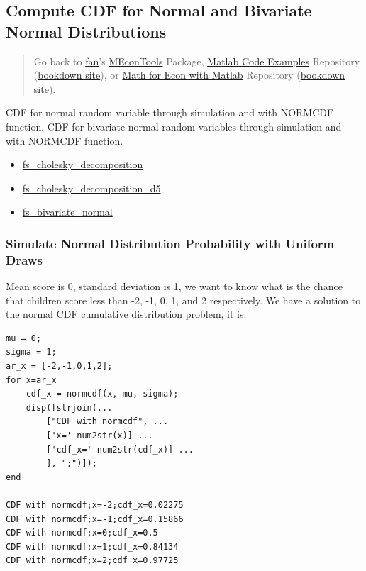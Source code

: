 \documentclass[
]{book}
\begin{document}
\hypertarget{compute-cdf-for-normal-and-bivariate-normal-distributions}{%
\subsection{Compute CDF for Normal and Bivariate Normal Distributions}\label{compute-cdf-for-normal-and-bivariate-normal-distributions}}

\begin{quote}
Go back to \href{http://fanwangecon.github.io/}{fan}'s \href{https://fanwangecon.github.io/MEconTools/}{MEconTools} Package, \href{https://fanwangecon.github.io/M4Econ/}{Matlab Code Examples} Repository (\href{https://fanwangecon.github.io/M4Econ/bookdown}{bookdown site}), or \href{https://fanwangecon.github.io/Math4Econ/}{Math for Econ with Matlab} Repository (\href{https://fanwangecon.github.io/Math4Econ/bookdown}{bookdown site}).
\end{quote}

CDF for normal random variable through simulation and with NORMCDF
function. CDF for bivariate normal random variables through simulation
and with NORMCDF function.

\begin{itemize}
\item
  \href{https://fanwangecon.github.io/M4Econ/simulation/normal/htmlpdfm/fs_cholesky_decomposition.html}{fs\_cholesky\_decomposition}
\item
  \href{https://fanwangecon.github.io/M4Econ/simulation/normal/htmlpdfm/fs_cholesky_decomposition_d5.html}{fs\_cholesky\_decomposition\_d5}
\item
  \href{https://fanwangecon.github.io/M4Econ/simulation/normal/htmlpdfm/fs_bivariate_normal.html}{fs\_bivariate\_normal}
\end{itemize}

\hypertarget{simulate-normal-distribution-probability-with-uniform-draws}{%
\subsubsection{Simulate Normal Distribution Probability with Uniform Draws}\label{simulate-normal-distribution-probability-with-uniform-draws}}

Mean score is 0, standard deviation is 1, we want to know what is the
chance that children score less than -2, -1, 0, 1, and 2 respectively.
We have a solution to the normal CDF cumulative distribution problem, it
is:

\begin{verbatim}
mu = 0;
sigma = 1;
ar_x = [-2,-1,0,1,2];
for x=ar_x
    cdf_x = normcdf(x, mu, sigma);
    disp([strjoin(...
        ["CDF with normcdf", ...
        ['x=' num2str(x)] ...
        ['cdf_x=' num2str(cdf_x)] ...
        ], ";")]);
end

CDF with normcdf;x=-2;cdf_x=0.02275
CDF with normcdf;x=-1;cdf_x=0.15866
CDF with normcdf;x=0;cdf_x=0.5
CDF with normcdf;x=1;cdf_x=0.84134
CDF with normcdf;x=2;cdf_x=0.97725
\end{verbatim}
\end{document}

